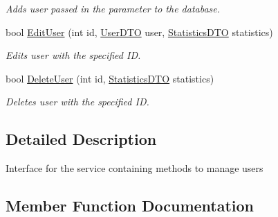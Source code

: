 \begin{DoxyCompactItemize}
\begin{DoxyCompactList}\small\item\em Adds user passed in the parameter to the database. \end{DoxyCompactList}\item 
bool \mbox{\hyperlink{interface_gielda_l2_1_1_i_n_f_r_a_s_t_r_u_c_t_u_r_e_1_1_interfaces_1_1_i_user_service_ab4f5c1c2ac78ee462e0a488b7f2ea50e}{Edit\+User}} (int id, \mbox{\hyperlink{class_gielda_l2_1_1_i_n_f_r_a_s_t_r_u_c_t_u_r_e_1_1_d_t_o_1_1_user_d_t_o}{User\+D\+TO}} user, \mbox{\hyperlink{class_gielda_l2_1_1_i_n_f_r_a_s_t_r_u_c_t_u_r_e_1_1_d_t_o_1_1_statistics_d_t_o}{Statistics\+D\+TO}} statistics)
\begin{DoxyCompactList}\small\item\em Edits user with the specified ID. \end{DoxyCompactList}\item 
bool \mbox{\hyperlink{interface_gielda_l2_1_1_i_n_f_r_a_s_t_r_u_c_t_u_r_e_1_1_interfaces_1_1_i_user_service_a3b6080d304c489e6876694388a692682}{Delete\+User}} (int id, \mbox{\hyperlink{class_gielda_l2_1_1_i_n_f_r_a_s_t_r_u_c_t_u_r_e_1_1_d_t_o_1_1_statistics_d_t_o}{Statistics\+D\+TO}} statistics)
\begin{DoxyCompactList}\small\item\em Deletes user with the specified ID. \end{DoxyCompactList}\end{DoxyCompactItemize}


\subsection{Detailed Description}
Interface for the service containing methods to manage users 



\subsection{Member Function Documentation}
\mbox{\label{interface_gielda_l2_1_1_i_n_f_r_a_s_t_r_u_c_t_u_r_e_1_1_interfaces_1_1_i_user_service_a964c730457bbce497d33fed5fda0b103}} 
